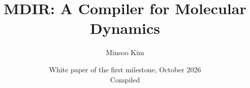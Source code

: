 \documentclass[10pt,a4paper]{article}
\title{MDIR: A Compiler for Molecular Dynamics}
\author{Minsoo Kim}
\date{White paper of the first milestone, October 2026\\[0.5em]
  {\small Compiled \paperbuildtime}}
\begin{document}
\maketitle
\begin{abstract}

\end{abstract}
\tableofcontents
\clearpage













\appendix




\end{document}
